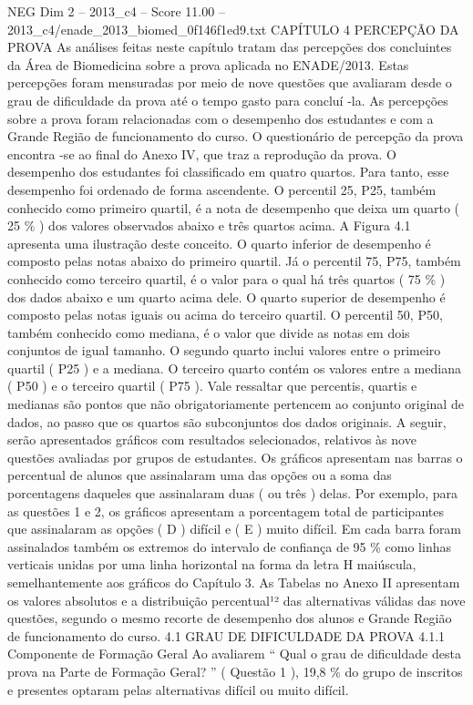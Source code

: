 \begin{textsample}{NEG Dim 2 – 2013\_c4 – Score 11.00 – 2013\_c4/enade\_2013\_biomed\_0f146f1ed9.txt}  \label{ex:f2_neg_368}
CAPÍTULO 4 PERCEPÇÃO DA PROVA As análises feitas neste capítulo tratam das percepções dos concluintes da Área de Biomedicina sobre a prova aplicada no ENADE/2013.
Estas percepções foram mensuradas por meio de nove questões que avaliaram desde o grau de dificuldade da prova até o tempo gasto para concluí -la.
As percepções sobre a prova foram relacionadas com o desempenho dos estudantes e com a Grande Região de funcionamento do curso.
O questionário de percepção da prova encontra -se ao final do Anexo IV, que traz a reprodução da prova.
O desempenho dos estudantes foi classificado em quatro quartos.
Para tanto, esse desempenho foi ordenado de forma ascendente.
O percentil 25, P25, também conhecido como primeiro quartil, é a nota de desempenho que deixa um quarto ( 25 \% ) dos valores observados abaixo e três quartos acima.
A Figura 4.1 apresenta uma ilustração deste conceito.
O quarto inferior de desempenho é composto pelas notas abaixo do primeiro quartil.
Já o percentil 75, P75, também conhecido como terceiro quartil, é o valor para o qual há três quartos ( 75 \% ) dos dados abaixo e um quarto acima dele.
O quarto superior de desempenho é composto pelas notas iguais ou acima do terceiro quartil.
O percentil 50, P50, também conhecido como mediana, é o valor que divide as notas em dois conjuntos de igual tamanho.
O segundo quarto inclui valores entre o primeiro quartil ( P25 ) e a mediana.
O terceiro quarto contém os valores entre a mediana ( P50 ) e o terceiro quartil ( P75 ).
Vale ressaltar que percentis, quartis e medianas são pontos que não obrigatoriamente pertencem ao conjunto original de dados, ao passo que os quartos são subconjuntos dos dados originais.
A seguir, serão apresentados gráficos com resultados selecionados, relativos às nove questões avaliadas por grupos de estudantes.
Os gráficos apresentam nas barras o percentual de alunos que assinalaram uma das opções ou a soma das porcentagens daqueles que assinalaram duas ( ou três ) delas.
Por exemplo, para as questões 1 e 2, os gráficos apresentam a porcentagem total de participantes que assinalaram as opções ( D ) difícil e ( E ) muito difícil.
Em cada barra foram assinalados também os extremos do intervalo de confiança de 95 \% como linhas verticais unidas por uma linha horizontal na forma da letra H maiúscula, semelhantemente aos gráficos do Capítulo 3.
As Tabelas no Anexo II apresentam os valores absolutos e a distribuição percentual¹² das alternativas válidas das nove questões, segundo o mesmo recorte de desempenho dos alunos e Grande Região de funcionamento do curso. 4.1 GRAU DE DIFICULDADE DA PROVA 4.1.1 Componente de Formação Geral Ao avaliarem “ Qual o grau de dificuldade desta prova na Parte de Formação Geral? ” ( Questão 1 ), 19,8 \% do grupo de inscritos e presentes optaram pelas alternativas difícil ou muito difícil.

\end{textsample}
